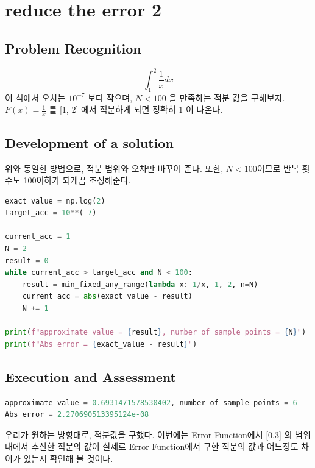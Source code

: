 \documentclass[11pt]{article}
\begin{document}
\section{reduce the error 2}
\subsection{Problem Recognition} 

\begin{equation}
\int_1^2 \frac{1}{x} dx
\end{equation}
이 식에서 오차는 $10^{-7}$ 보다 작으며, $N < 100$ 을 만족하는 적분 값을 구해보자.$ F(x)= \frac{1}{x}  $ 를 [1, 2] 에서 적분하게 되면 정확히 $1$ 이 나온다.

\subsection{Development of a solution} 
위와 동일한 방법으로, 적분 범위와 오차만 바꾸어 준다. 또한, $N < 100 $이므로 반복 횟수도 100이하가 되게끔 조정해준다.

\begin{lstlisting}[language=Python]
exact_value = np.log(2)
target_acc = 10**(-7)

current_acc = 1
N = 2
result = 0
while current_acc > target_acc and N < 100:
    result = min_fixed_any_range(lambda x: 1/x, 1, 2, n=N)
    current_acc = abs(exact_value - result)
    N += 1
    
print(f"approximate value = {result}, number of sample points = {N}")
print(f"Abs error = {exact_value - result}")
\end{lstlisting}

\subsection{Execution and Assessment} 

\begin{lstlisting}[language=Python]
approximate value = 0.6931471578530402, number of sample points = 6
Abs error = 2.270690513395124e-08
\end{lstlisting}
우리가 원하는 방향대로, 적분값을 구했다. 이번에는 Error Function에서 [0.3] 의 범위내에서 추산한 적분의 값이 실제로 Error Function에서 구한 적분의 값과 어느정도 차이가 있는지 확인해 볼 것이다.
\end{document}
